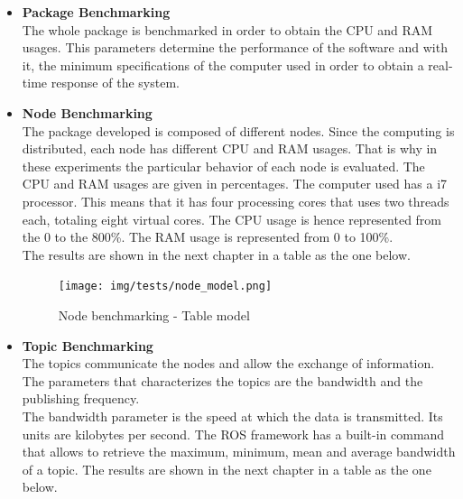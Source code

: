	\begin{itemize}
		\item{\textbf{Package Benchmarking}}
		\\
		The whole package is benchmarked in order to obtain the CPU and RAM usages. 
		This parameters determine the performance of the software and with it, the minimum specifications of the computer used in order to obtain a real-time response of the system.  
		\\[0.5cm]

		\item{\textbf{Node Benchmarking}}
		\\
		The package developed is composed of different nodes. 
		Since the computing is distributed, each node has different CPU and RAM usages.
		That is why in these experiments the particular behavior of each node is evaluated. 
		The CPU and RAM usages are given in percentages. 
		The computer used has a i7 processor. 
		This means that it has four processing cores that uses two threads each, totaling eight virtual cores. 
		The CPU usage is hence represented from the 0 to the 800\%.
		The RAM usage is represented from 0 to 100\%.
		\\[0.5cm]
		The results are shown in the next chapter in a table as the one below. 

		\begin{figure}[H]
				\begin{center}
			    \texttt{[image: img/tests/node\_model.png]}
				\caption[Node benchmarking - Table model]{Node benchmarking - Table model}
				\end{center}
		\end{figure}

		\item{\textbf{Topic Benchmarking}}\\
		The topics communicate the nodes and allow the exchange of information. 
		The parameters that characterizes the topics are the bandwidth and the publishing frequency.
		\\

		The bandwidth parameter is the speed at which the data is transmitted. 
		Its units are kilobytes per second. 
		The ROS framework has a built-in command that allows to retrieve the maximum, minimum, mean and average bandwidth of a topic. 
		The results are shown in the next chapter in a table as the one below. 


\end{itemize}
